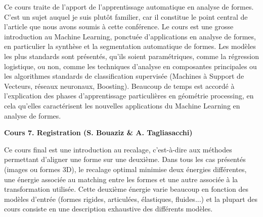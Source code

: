 \documentclass[a4paper, 11pt]{article}
\begin{document}
Ce cours traite de l'apport de l'apprentissage automatique en analyse de formes. C'est un sujet auquel je suis plut\^ot familier,
car il constitue le point central de l'article que nous avons soumis \`a cette conf\'erence.
Le cours est une grosse introduction au Machine Learning, ponctu\'ee d'applications en analyse de formes, en particulier
la synth\`ese et la segmentation automatique de formes. Les mod\`eles les plus standards sont pr\'esent\'es, qu'ils soient
param\'etriques, comme la r\'egression logistique, ou non, comme les techniques d'analyse en composantes principales ou les
algorithmes standards de classification supervis\'ee (Machines \`a Support de Vecteurs, r\'eseaux neuronaux, Boosting).
Beaucoup de temps est accord\'e \`a l'explication des phases d'apprentissage particuli\`eres en g\'eom\'etrie processing, 
en cela qu'elles caract\'erisent les nouvelles applications du Machine Learning en analyse de formes.

\begin{center} \textbf{Cours 7. Registration (S. Bouaziz \& A. Tagliasacchi)} \end{center}

Ce cours final est une introduction au recalage, c'est-\`a-dire aux m\'ethodes permettant d'aligner une forme sur une
deuxi\`eme. Dans tous les cas pr\'esent\'es (images ou formes 3D), le recalage optimal minimise deux \'energies diff\'erentes,
une \'energie associ\'ee au matching entre les formes et une autre associ\'ee \`a la transformation utilis\'ee.
Cette deuxi\`eme \'energie varie beaucoup en fonction des mod\`eles d'entr\'ee (formes rigides, articul\'ees, \'elastiques, fluides...)
et la plupart des cours consiste en une description exhaustive des diff\'erents mod\`eles.
\end{document}
